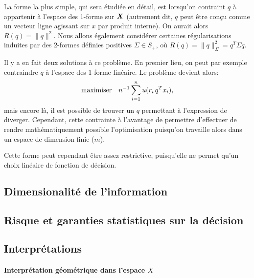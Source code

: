 La forme la plus simple, qui sera étudiée en détail, est lorsqu'on contraint $q$ à
appartenir à l'espace des 1-forme sur $\bm{X}$ (autrement dit, $q$ peut être conçu comme un
vecteur ligne agissant sur $x$ par produit interne). On aurait alors $R(q) =
\|q\|^2$. Nous allons également considérer certaines régularisations induites par des
2-formes définies positives $\Sigma \in S_+$, où $R(q) = \|q\|^2_\Sigma = q^T \Sigma q$.

Il y a en fait deux solutions à ce problème. En premier lieu, on peut par exemple
contraindre $q$ à l'espace des 1-forme linéaire. Le problème devient alors:
\begin{equation}
  \displaystyle{\begin{array}{ll} \displaystyle{\operatorname*{maximiser}_{}} & \displaystyle{n^{-1} \sum_{i=1}^nu(r_i\,q^Tx_i),} \end{array}}
\end{equation}
mais encore là, il est possible de trouver un $q$ permettant à l'expression de
diverger. Cependant, cette contrainte à l'avantage de permettre d'effectuer de rendre
mathématiquement possible l'optimisation puisqu'on travaille alors dans un espace de
dimension finie ($m$).

Cette forme peut cependant être assez restrictive, puisqu'elle ne permet qu'un choix
linéaire de fonction de décision.




\subsection{Dimensionalité de l'information}




\subsection{Risque et garanties statistiques sur la décision}



\subsection{Interprétations}

\paragraph{Interprétation géométrique dans l'espace $X$}

